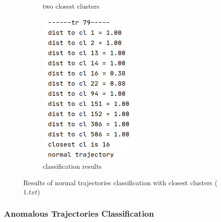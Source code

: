 \begin{figure}[htb!]
\begin{subfigure}[!htb]{0.24\textwidth}
		\caption{two closest clusters}
	\end{subfigure}
	\hfill
	\begin{subfigure}[!htb]{0.23\textwidth}
		\centering{}
		\includegraphics[width=\textwidth]{images/classif-res/classif-stat.png}
		\caption{classification results}
	\end{subfigure}
	
	\caption{Results of normal trajectories classification with closest clusters ($1.txt$)}
	\label{fig:classif-norm-res-111}
\end{figure}

\subsubsection{Anomalous Trajectories Classification}

